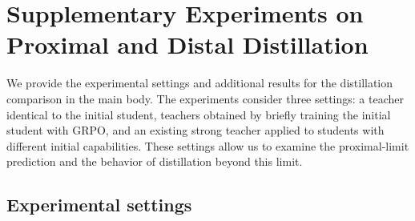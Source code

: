 \section{Supplementary Experiments on Proximal and Distal Distillation}
\label{app:distillation-experiments}

We provide the experimental settings and additional results for the
distillation comparison in the main body. The experiments consider three
settings: a teacher identical to the initial student, teachers obtained
by briefly training the initial student with GRPO, and an existing strong
teacher applied to students with different initial capabilities. These
settings allow us to examine the proximal-limit prediction and the
behavior of distillation beyond this limit.

\subsection{Experimental settings}


